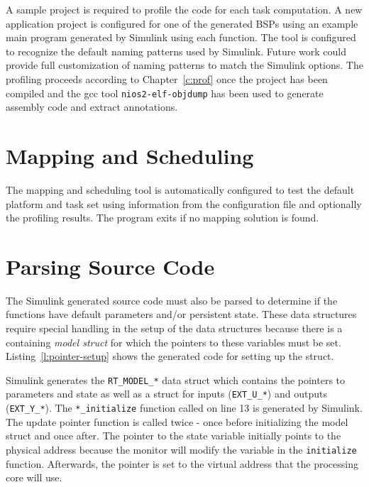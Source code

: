 	A sample project is required to profile the code for each task computation. 
	A new application project is configured for one of the generated BSPs using an example main program generated by Simulink using each function. 
	The tool is configured to recognize the default naming patterns used by Simulink. 
	Future work could provide full customization of naming patterns to match the Simulink options. 
	The profiling proceeds according to Chapter~\ref{c:prof} once the project has been compiled and the gcc tool \texttt{nios2-elf-objdump} has been used to generate assembly code and extract annotations.

\section{Mapping and Scheduling}
	The mapping and scheduling tool is automatically configured to test the default platform and task set using information from the configuration file and optionally the profiling results.
	The program exits if no mapping solution is found.

\section{Parsing Source Code}

	The Simulink generated source code must also be parsed to determine if the functions have default parameters and/or persistent state. 
	These data structures require special handling in the setup of the data structures because there is a containing \emph{model struct} for which the pointers to these variables must be set. 
	Listing~\ref{l:pointer-setup} shows the generated code for setting up the struct.
	
	

	Simulink generates the \texttt{RT\_MODEL\_*} data struct which contains the pointers to parameters and state as well as a struct for inputs (\texttt{EXT\_U\_*}) and outputs (\texttt{EXT\_Y\_*}). 
	The \texttt{*\_initialize} function called on line 13 is generated by Simulink. The update pointer function is called twice - once before initializing the model struct and once after. 
	The pointer to the state variable initially points to the physical address because the monitor will modify the variable in the \texttt{initialize} function. 
	Afterwards, the pointer is set to the virtual address that the processing core will use.

